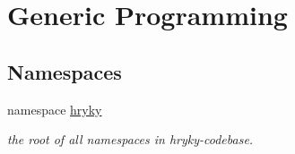 \hypertarget{group__generic__programming}{\section{Generic Programming}
\label{group__generic__programming}
}
\subsection*{Namespaces}
\begin{DoxyCompactItemize}
\item 
namespace \hyperlink{namespacehryky}{hryky}
\begin{DoxyCompactList}\small\item\em the root of all namespaces in hryky-\/codebase. \end{DoxyCompactList}\end{DoxyCompactItemize}
